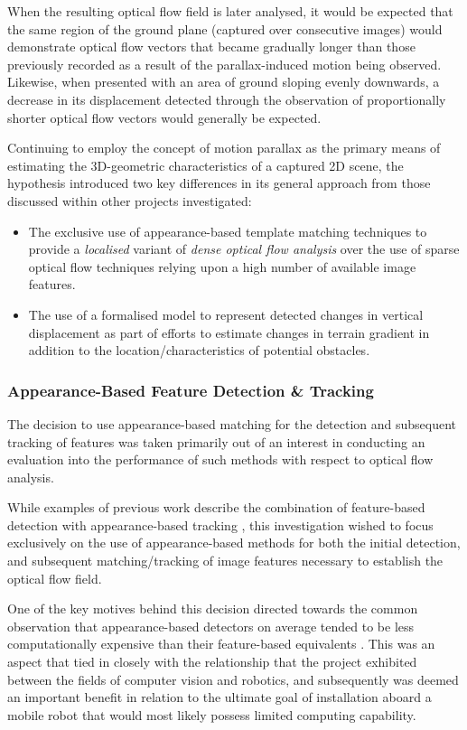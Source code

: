When the resulting optical flow field is later analysed, it would be expected that the same region of the ground plane (captured over consecutive images) would demonstrate optical flow vectors that became gradually longer than those previously recorded as a result of the parallax-induced motion being observed. Likewise, when presented with an area of ground sloping evenly downwards, a decrease in its displacement detected through the observation of proportionally shorter optical flow vectors would generally be expected.  

Continuing to employ the concept of motion parallax as the primary means of estimating the 3D-geometric characteristics of a captured 2D scene, the hypothesis introduced two key differences in its general approach from those discussed within other projects investigated:

\begin{itemize}
	\item The exclusive use of appearance-based template matching techniques to provide a \textit{localised} variant of \textit{dense optical flow analysis} over the use of sparse optical flow techniques relying upon a high number of available image features.
	\item The use of a formalised model to represent detected changes in vertical displacement as part of efforts to estimate changes in terrain gradient in addition to the location/characteristics of potential obstacles. 
\end{itemize}

\subsubsection{Appearance-Based Feature Detection \& Tracking}
\label{hypo-tracking}

The decision to use appearance-based matching for the detection and subsequent tracking of features was taken primarily out of an interest in conducting an evaluation into the performance of such methods with respect to optical flow analysis. 

While examples of previous work describe the combination of feature-based detection with appearance-based tracking \cite{low}, this investigation wished to focus exclusively on the use of appearance-based methods for both the initial detection, and subsequent matching/tracking of image features necessary to establish the optical flow field.

One of the key motives behind this decision directed towards the common observation that appearance-based detectors on average tended to be less computationally expensive than their feature-based equivalents \cite{}. This was an aspect that tied in closely with the relationship that the project exhibited between the fields of computer vision and robotics, and subsequently was deemed an important benefit in relation to the ultimate goal of installation aboard a mobile robot that would most likely possess limited computing capability.

